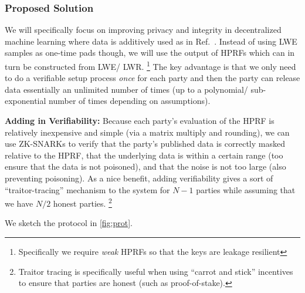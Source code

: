 \documentclass[11pt]{article}
\begin{document}
\subsubsection*{Proposed Solution}
We will specifically focus on improving privacy and integrity in decentralized machine learning where data is additively used as in Ref.~\cite{stevens2021efficientdifferentiallyprivatesecure}.
Instead of using LWE samples as one-time pads though, we will use the output of HPRFs which can in turn be constructed from LWE/ LWR.
\footnote{Specifically we require \emph{weak} HPRFs so that the keys are leakage resilient}
The key advantage is that we only need to do a verifiable setup process \emph{once} for each party and then the party can release data essentially an unlimited number of times (up to a polynomial/ sub-exponential number of times depending on assumptions).

\textbf{Adding in Verifiability:} Because each party's evaluation of the HPRF is relatively inexpensive and simple (via a matrix multiply and rounding), we can use ZK-SNARKs to verify that the party's published data is correctly masked relative to the HPRF, that the underlying data is within a certain range (too ensure that the data is not poisoned), and that the noise is not too large (also preventing poisoning).
As a nice benefit, adding verifiability gives a sort of ``traitor-tracing'' mechanism to the system for $N - 1$ parties while assuming that we have $N /2$ honest parties.
\footnote{Traitor tracing is specifically useful when using ``carrot and stick'' incentives to ensure that parties are honest (such as proof-of-stake).}

We sketch the protocol in \cref{fig:prot}.
\end{document}
